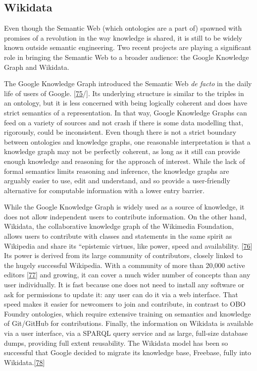 \hypertarget{wikidata}{%
\subsection{Wikidata}\label{wikidata}}

Even though the Semantic Web (which ontologies are a part of) spawned with promises of a revolution in the way knowledge is shared, it is still to be widely known outside semantic engineering. Two recent projects are playing a significant role in bringing the Semantic Web to a broader audience: the Google Knowledge Graph and Wikidata.

The Google Knowledge Graph introduced the Semantic Web \emph{de facto} in the daily life of users of Google. {[}\protect\hyperlink{ref-16mCkZC1r}{75}/{]}. Its underlying structure is similar to the triples in an ontology, but it is less concerned with being logically coherent and does have strict semantics of a representation.
In that way, Google Knowledge Graphs can feed on a variety of sources and not crash if there is some data modelling that, rigorously, could be inconsistent.
Even though there is not a strict boundary between ontologies and knowledge graphs, one reasonable interpretation is that a knowledge graph may not be perfectly coherent, as long as it still can provide enough knowledge and reasoning for the approach of interest.
While the lack of formal semantics limits reasoning and inference, the knowledge graphs are arguably easier to use, edit and understand, and so provide a user-friendly alternative for computable information with a lower entry barrier.

While the Google Knowledge Graph is widely used as a source of knowledge, it does not allow independent users to contribute information.
On the other hand, Wikidata, the collaborative knowledge graph of the Wikimedia Foundation, allows users to contribute with classes and statements in the same spirit as Wikipedia and share its ``epistemic virtues, like power, speed and availability. {[}\protect\hyperlink{ref-qMozvNth}{76}{]}
Its power is derived from its large community of contributors, closely linked to the hugely successful Wikipedia.
With a community of more than 20,000 active editors {[}\protect\hyperlink{ref-SGzjBOG0}{77}{]} and growing, it can cover a much wider number of concepts than any user individually.
It is fast because one does not need to install any software or ask for permissions to update it: any user can do it via a web interface.
That speed makes it easier for newcomers to join and contribute, in contrast to OBO Foundry ontologies, which require extensive training on semantics and knowledge of Git/GitHub for contributions.
Finally, the information on Wikidata is available via a user interface, via a SPARQL query service and as large, full-size database dumps, providing full extent reusability.
The Wikidata model has been so successful that Google decided to migrate its knowledge base, Freebase, fully into Wikidata.{[}\protect\hyperlink{ref-xLpRePoh}{78}{]}

